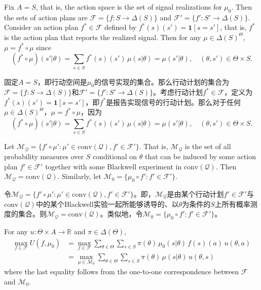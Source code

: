 \documentclass[12pt,a4paper]{article}
\newenvironment{original}
  {\par\vspace{4pt}\noindent\color{black}\ignorespaces}
  {\par\vspace{2pt}}
\newenvironment{translation}
  {\par\vspace{2pt}\noindent\color{myblue}\ignorespaces}
  {\par\vspace{6pt}}
\newcommand{\R}{\mathbb{R}}
\newcommand{\Delt}{\Delta}
\newcommand{\calF}{\mathcal{F}}
\newcommand{\conv}{\mathrm{conv}}
\newcommand{\bbone}{\mathbf{1}}
\begin{document}
\begin{original}
Fix $A=S$, that is, the action space is the set of signal realizations for $\mu_0$. Then the sets of action plans are $\calF=\{f:S\to\Delt(S)\}$ and $\calF'=\{f':S'\to\Delt(S)\}$. Consider an action plan $f^*\in\calF$ defined by $f^*(s)(s')=\bbone[s=s']$, that is, $f^*$ is the action plan that reports the realized signal. Then for any $\mu\in\Delt(S)^{\Theta}$, $\mu=f^*\circ\mu$ since
\begin{equation}
    (f^*\circ\mu)(s'|\theta) = \sum_{s\in S} f^*(s)(s')\,\mu(s|\theta) = \mu(s'|\theta), \quad (\theta,s')\in\Theta\times S.
\end{equation}
\end{original}

\begin{translation}
固定$A=S$，即行动空间是$\mu_0$的信号实现的集合。那么行动计划的集合为$\calF=\{f:S\to\Delt(S)\}$和$\calF'=\{f':S'\to\Delt(S)\}$。考虑行动计划$f^*\in\calF$，定义为$f^*(s)(s')=\bbone[s=s']$，即$f^*$是报告实现信号的行动计划。那么对于任何$\mu\in\Delt(S)^{\Theta}$，$\mu=f^*\circ\mu$，因为
\begin{equation}
    (f^*\circ\mu)(s'|\theta) = \sum_{s\in S} f^*(s)(s')\,\mu(s|\theta) = \mu(s'|\theta), \quad (\theta,s')\in\Theta\times S.
\end{equation}
\end{translation}

\begin{original}
Let $\mathcal{M}_{\mathcal{Q}}=\{f'\circ\mu':\mu'\in\conv(\mathcal{Q}), f'\in\calF'\}$. That is, $\mathcal{M}_{\mathcal{Q}}$ is the set of all probability measures over $S$ conditional on $\theta$ that can be induced by some action plan $f'\in\calF'$ together with some Blackwell experiment in $\conv(\mathcal{Q})$. Then $\mathcal{M}_{\mathcal{Q}}=\conv(\mathcal{Q})$. Similarly, let $\mathcal{M}_0=\{\mu_0\circ f': f'\in\calF'\}$.
\end{original}

\begin{translation}
令$\mathcal{M}_{\mathcal{Q}}=\{f'\circ\mu':\mu'\in\conv(\mathcal{Q}), f'\in\calF'\}$。即，$\mathcal{M}_{\mathcal{Q}}$是由某个行动计划$f'\in\calF'$与$\conv(\mathcal{Q})$中的某个Blackwell实验一起所能够诱导的、以$\theta$为条件的$S$上所有概率测度的集合。则$\mathcal{M}_{\mathcal{Q}}=\conv(\mathcal{Q})$。类似地，令$\mathcal{M}_0=\{\mu_0\circ f': f'\in\calF'\}$。
\end{translation}

\begin{original}
For any $u:\Theta\times A\to\R$ and $\pi\in\Delt(\Theta)$,
\begin{align}
    \max_{f\in\calF} U(f, \mu_0) &= \max_{f\in\calF} \sum_{\theta\in\Theta}\sum_{s\in S} \pi(\theta)\,\mu_0(s|\theta)\,f(s)(a)\,u(\theta,a) \nonumber\\
                                 &= \max_{\mu\in\mathcal{M}_0} \sum_{\theta\in\Theta}\sum_{s\in S} \pi(\theta)\,\mu(s|\theta)\,u(\theta,s)
\end{align}
where the last equality follows from the one-to-one correspondence between $\calF$ and $\mathcal{M}_0$.
\end{original}
\end{document}
